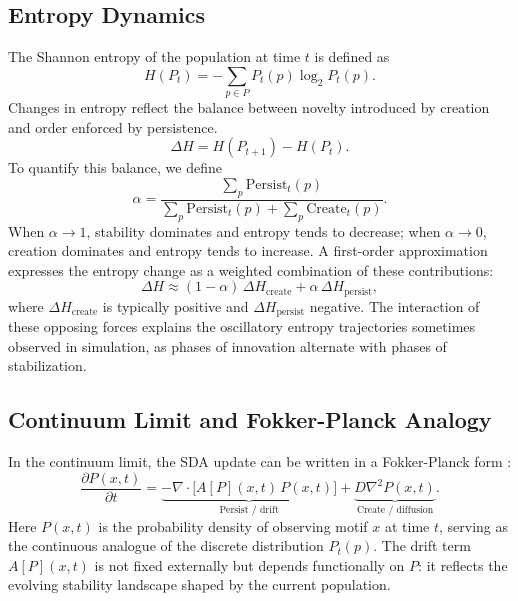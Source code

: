 \documentclass[life,article,submit,pdftex,moreauthors]{Definitions/mdpi}
\begin{document}
\subsection{Entropy Dynamics}

The Shannon entropy of the population at time $t$ is defined as
\begin{equation}
H(P_t) = - \sum_{p \in P} P_t(p) \log_2 P_t(p).
\end{equation}
Changes in entropy reflect the balance between novelty introduced by creation and order enforced by persistence.
\begin{equation}
\Delta H = H(P_{t+1}) - H(P_t).
\end{equation}
To quantify this balance, we define
\begin{equation}
\alpha = \frac{\sum_p \mathrm{Persist}_t(p)}
{\sum_p \mathrm{Persist}_t(p) + \sum_p \mathrm{Create}_t(p)}.
\end{equation}
When $\alpha \to 1$, stability dominates and entropy tends to decrease; when $\alpha \to 0$, creation dominates and entropy tends to increase.  
A first-order approximation expresses the entropy change as a weighted combination of these contributions:
\begin{equation}
\Delta H \approx (1 - \alpha)\,\Delta H_{\text{create}} + \alpha\,\Delta H_{\text{persist}},
\end{equation}
where $\Delta H_{\text{create}}$ is typically positive and $\Delta H_{\text{persist}}$ negative.  The interaction of these opposing forces explains the oscillatory entropy trajectories sometimes observed in simulation, as phases of innovation alternate with phases of stabilization.

\subsection{Continuum Limit and Fokker-Planck Analogy}

In the continuum limit, the SDA update can be written in a Fokker-Planck form \cite{gardiner2009}:
\begin{equation}
\frac{\partial P(x,t)}{\partial t}
= \underbrace{- \nabla \cdot \big[ A[P](x,t)\, P(x,t) \big]}_{\text{Persist / drift}}
+ \underbrace{D \nabla^2 P(x,t)}_{\text{Create / diffusion}}.
\end{equation}
Here $P(x,t)$ is the probability density of observing motif $x$ at time $t$, 
serving as the continuous analogue of the discrete distribution $P_t(p)$. 
The drift term $A[P](x,t)$ is not fixed externally but depends functionally on $P$: 
it reflects the evolving stability landscape shaped by the current population. 
\end{document}
